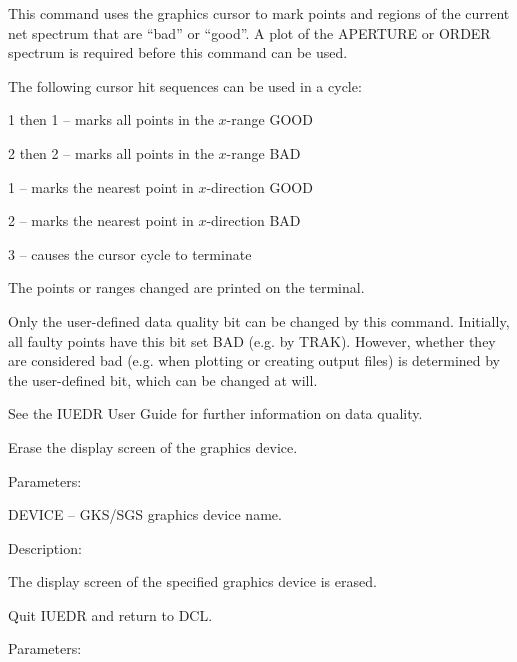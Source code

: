 \begin {description}
\begin {description}
This command uses the graphics cursor to mark points and
regions of the current net spectrum that are ``bad'' or ``good''.
A plot of the APERTURE or ORDER spectrum is required before this
command can be used.

The following cursor hit sequences can be used in a cycle:

\begin {description}
\item 1 then 1 -- marks all points in the $x$-range GOOD
\item 2 then 2 -- marks all points in the $x$-range BAD
\item 1 -- marks the nearest point in $x$-direction GOOD
\item 2 -- marks the nearest point in $x$-direction BAD
\item 3 -- causes the cursor cycle to terminate
\end {description}

The points or ranges changed are printed on the terminal.

Only the user-defined data quality bit can be changed by this
command.
Initially, all faulty points have this bit set BAD (e.g. by TRAK).
However, whether they are considered bad (e.g. when plotting
or creating output files) is determined by the user-defined
bit, which can be changed at will.

See the IUEDR User Guide for further information on data quality.
\end {description}

\item [ERASE]
Erase the display screen of the graphics device.

\begin {description}
\item Parameters:

\begin {description}
\item DEVICE -- GKS/SGS graphics device name.
\end {description}

\item Description:

The display screen of the specified graphics device is erased.
\end {description}

\item [EXIT]
Quit IUEDR and return to DCL.

\begin {description}
\item Parameters:


\end{description}
\end{description}
